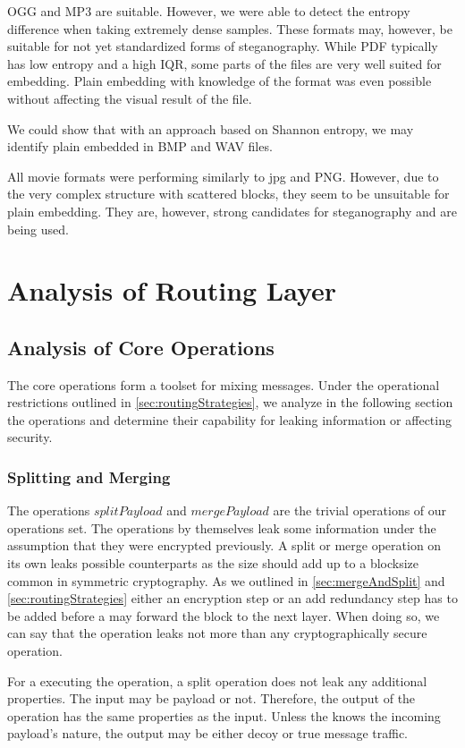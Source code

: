 OGG and MP3 are suitable. However, we were able to detect the entropy difference when taking extremely dense samples. These formats may, however, be suitable for not yet standardized forms of steganography. While PDF typically has low entropy and a high IQR, some parts of the files are very well suited for embedding. Plain embedding with knowledge of the format was even possible without affecting the visual result of the file.

We could show that with an approach based on Shannon entropy, we may identify plain embedded \VortexMessages{} in BMP and WAV files. 

All movie formats were performing similarly to jpg and PNG. However, due to the very complex structure with scattered blocks, they seem to be unsuitable for plain embedding. They are, however, strong candidates for steganography and are being used.

\section{Analysis of Routing Layer}
\subsection{Analysis of Core Operations}
The core operations form a toolset for mixing messages. Under the operational restrictions outlined in \cref{sec:routingStrategies}, we analyze in the following section the operations and determine their capability for leaking information or affecting security.

\subsubsection{Splitting and Merging}
The operations $splitPayload$ and $mergePayload$ are the trivial operations of our operations set. The operations by themselves leak some information under the assumption that they were encrypted previously. A split or merge operation on its own leaks possible counterparts as the size should add up to a blocksize common in symmetric cryptography. As we outlined in \cref{sec:mergeAndSplit} and \cref{sec:routingStrategies} either an encryption step or an add redundancy step has to be added before a \VortexNode{} may forward the block to the next layer. When doing so, we can say that the operation leaks not more than any cryptographically secure operation.

For a \VortexNode{} executing the operation, a split operation does not leak any additional properties. The input may be payload or not. Therefore, the output of the operation has the same properties as the input. Unless the \VortexNodes{} knows the incoming payload's nature, the output may be either decoy or true message traffic.

